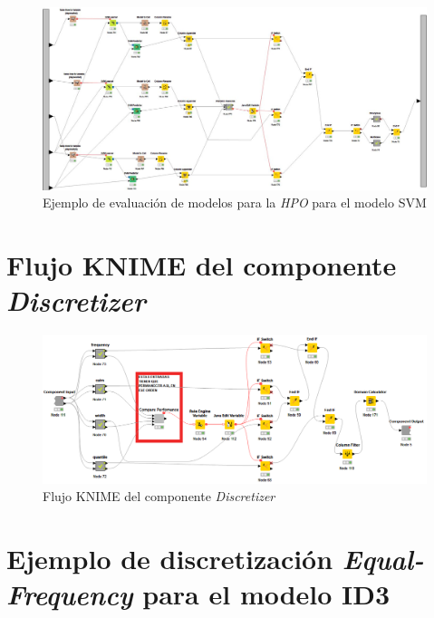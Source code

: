 \begin{figure}[H]
	\centering
	\includegraphics[width=\textwidth]{"figuras/anexos/Anexo random Evaluacion de modelos (SVM)"}
	\caption{Ejemplo de evaluación de modelos para la \textit{HPO} para el modelo SVM}
	\label{anex:evaluacion-de-modelos-svm}
\end{figure}


\chapter{Flujo KNIME del componente \textit{Discretizer}} \label{aped:8}

\begin{figure}[H]
	\centering
	\includegraphics[width=\textwidth]{figuras/anexos/discretizer}
	\caption{Flujo KNIME del componente \textit{Discretizer}}
	\label{anex:discretizer}
\end{figure}


\chapter{Ejemplo de discretización \textit{Equal-Frequency} para el modelo ID3} \label{aped:9}

